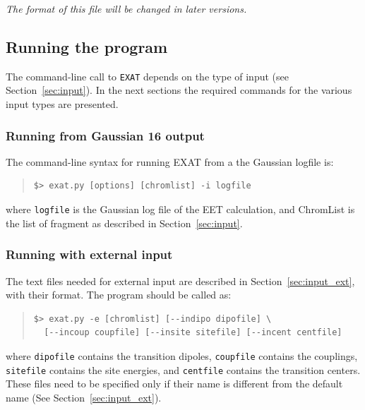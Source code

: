 \documentclass[a4paper,11pt]{article}
\begin{document}
\emph{The format of this file will be changed in later versions.}

\subsection{Running the program}

The command-line call to \texttt{EXAT} depends on the type of input (see Section~\ref{sec:input}). In the next sections the required commands for the various input types are presented.

\subsubsection{Running from Gaussian 16 output}

The command-line syntax for running EXAT from a the Gaussian logfile is:

\begin{framed}
\begin{quote}
\begin{verbatim}
$> exat.py [options] [chromlist] -i logfile
\end{verbatim}
\end{quote}
\end{framed}

where \texttt{logfile} is the Gaussian log file of the EET calculation, and ChromList is the list of fragment as described in Section~\ref{sec:input}. 


\subsubsection{Running with external input}

The text files needed for external input are described in Section~\ref{sec:input_ext}, with their format. The program should be called as:

\begin{framed}
\begin{quote}
\begin{verbatim}
$> exat.py -e [chromlist] [--indipo dipofile] \
  [--incoup coupfile] [--insite sitefile] [--incent centfile]
\end{verbatim}
\end{quote}
\end{framed}

where \texttt{dipofile} contains the transition dipoles, \texttt{coupfile} contains the couplings, \texttt{sitefile} contains the site energies, and \texttt{centfile} contains the transition centers. These files need to be specified only if their name is different from the default name (See Section~\ref{sec:input_ext}).
\end{document}
